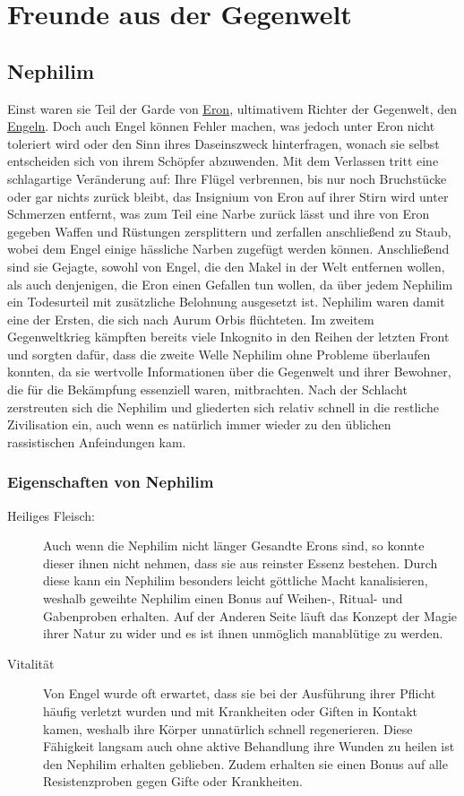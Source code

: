 \documentclass[a4paper,12pt,oneside]{book}
\begin{document}
\chapter{Freunde aus der Gegenwelt}

\section{Nephilim}\label{Nephilim}
Einst waren sie Teil der Garde von \uline{\hyperref[Eron]{Eron}}, ultimativem Richter der Gegenwelt, den \uline{\hyperref[Engel]{Engeln}}. Doch auch Engel können Fehler machen, was jedoch unter Eron nicht toleriert wird oder den Sinn ihres Daseinszweck hinterfragen, wonach sie selbst entscheiden sich von ihrem Schöpfer abzuwenden. Mit dem Verlassen tritt eine schlagartige Veränderung auf: Ihre Flügel verbrennen, bis nur noch Bruchstücke oder gar nichts zurück bleibt, das Insignium von Eron auf ihrer Stirn wird unter Schmerzen entfernt, was zum Teil eine Narbe zurück lässt und ihre von Eron gegeben Waffen und Rüstungen zersplittern und zerfallen anschließend zu Staub, wobei dem Engel einige hässliche Narben zugefügt werden können. Anschließend sind sie Gejagte, sowohl von Engel, die den Makel in der Welt entfernen wollen, als auch denjenigen, die Eron einen Gefallen tun wollen, da über jedem Nephilim ein Todesurteil mit zusätzliche Belohnung ausgesetzt ist. Nephilim waren damit eine der Ersten, die sich nach Aurum Orbis flüchteten. Im zweitem Gegenweltkrieg kämpften bereits viele Inkognito in den Reihen der letzten Front und sorgten dafür, dass die zweite Welle Nephilim ohne Probleme überlaufen konnten, da sie wertvolle Informationen über die Gegenwelt und ihrer Bewohner, die für die Bekämpfung essenziell waren, mitbrachten. Nach der Schlacht zerstreuten sich die Nephilim und gliederten sich relativ schnell in die restliche Zivilisation ein, auch wenn es natürlich immer wieder zu den üblichen rassistischen Anfeindungen kam.
\subsection{Eigenschaften von Nephilim}
\begin{description}
\item[Heiliges Fleisch:]
Auch wenn die Nephilim nicht länger Gesandte Erons sind, so konnte dieser ihnen nicht nehmen, dass sie aus reinster Essenz bestehen. Durch diese kann ein Nephilim besonders leicht göttliche Macht kanalisieren, weshalb geweihte Nephilim einen Bonus auf Weihen-, Ritual- und Gabenproben erhalten. Auf der Anderen Seite läuft das Konzept der Magie ihrer Natur zu wider und es ist ihnen unmöglich manablütige zu werden.
\item[Vitalität]
Von Engel wurde oft erwartet, dass sie bei der Ausführung ihrer Pflicht häufig verletzt wurden und mit Krankheiten oder Giften in Kontakt kamen, weshalb ihre Körper unnatürlich schnell regenerieren. Diese Fähigkeit langsam auch ohne aktive Behandlung ihre Wunden zu heilen ist den Nephilim erhalten geblieben. Zudem erhalten sie einen Bonus auf alle Resistenzproben gegen Gifte oder Krankheiten.
\end{description}
\end{document}
